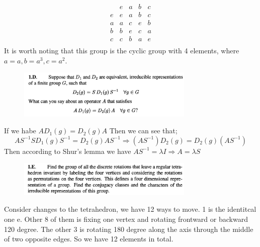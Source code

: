 \[
 \begin{array}{c|cccc}
 & e & a & b & c\\
\hline
   e & e & a & b&c \\
   a & a & c & e &b  \\
   b & b & e & c & a\\
   c & c & b & a & e \\
\end{array}
\]
It is worth noting that this group is the cyclic group with 4 elements, where $ a = a, b= a^3, c = a^2 $. 
\line
\begin{figure}[H]
  \centering
  \includegraphics[width=0.75\textwidth]{assets/Ques3.png}
  \label{fig:ques3}
\end{figure}
If we habe $ A D_1(g) = D_2(g) A $ Then we can see that;
\begin{equation}
  A S^{-1}S D_1(g)S^{-1} = D_2(g) A S^{-1} \Rightarrow (AS^{-1}) D_2(g) = D_2(g) (AS^{-1})
  \label{eq:deuct}
\end{equation}
Then according to Shur's lemma we have $ AS^{-1} = \lambda I \Rightarrow A = \lambda S $
\line
\begin{figure}[H]
  \centering
  \includegraphics[width=0.75\textwidth]{assets/Ques4.png}
  \label{fig:ques4}
\end{figure}
Consider changes to the tetrahedron, we have 12 ways to move. 1 is the identitcal one e. Other 8 of them is fixing one vertex and rotating frontward or backward 120 degree. The other 3 is rotating 180 degree along the axis through the middle of two opposite edges. So we have 12 elements in total. 

